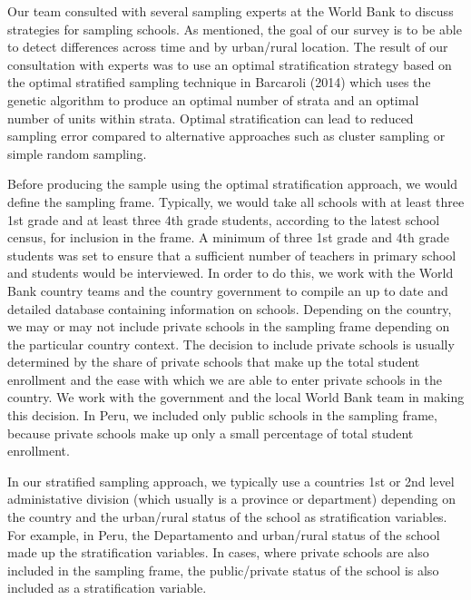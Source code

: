 \documentclass[]{article}
\begin{document}
Our team consulted with several sampling experts at the World Bank to
discuss strategies for sampling schools. As mentioned, the goal of our
survey is to be able to detect differences across time and by
urban/rural location. The result of our consultation with experts was to
use an optimal stratification strategy based on the optimal stratified
sampling technique in Barcaroli (2014) which uses the genetic algorithm
to produce an optimal number of strata and an optimal number of units
within strata. Optimal stratification can lead to reduced sampling error
compared to alternative approaches such as cluster sampling or simple
random sampling.

Before producing the sample using the optimal stratification approach,
we would define the sampling frame. Typically, we would take all schools
with at least three 1st grade and at least three 4th grade students,
according to the latest school census, for inclusion in the frame. A
minimum of three 1st grade and 4th grade students was set to ensure that
a sufficient number of teachers in primary school and students would be
interviewed. In order to do this, we work with the World Bank country
teams and the country government to compile an up to date and detailed
database containing information on schools. Depending on the country, we
may or may not include private schools in the sampling frame depending
on the particular country context. The decision to include private
schools is usually determined by the share of private schools that make
up the total student enrollment and the ease with which we are able to
enter private schools in the country. We work with the government and
the local World Bank team in making this decision. In Peru, we included
only public schools in the sampling frame, because private schools make
up only a small percentage of total student enrollment.

In our stratified sampling approach, we typically use a countries 1st or
2nd level administative division (which usually is a province or
department) depending on the country and the urban/rural status of the
school as stratification variables. For example, in Peru, the
Departamento and urban/rural status of the school made up the
stratification variables. In cases, where private schools are also
included in the sampling frame, the public/private status of the school
is also included as a stratification variable.
\end{document}
